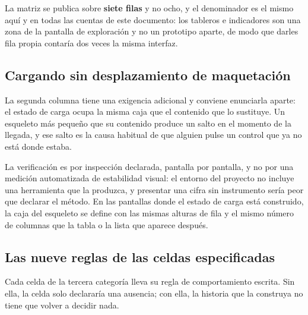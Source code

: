 La matriz se publica sobre \textbf{siete filas} y no ocho, y el denominador es el mismo aquí y en
todas las cuentas de este documento: los tableros e indicadores son una zona de la pantalla de
exploración y no un prototipo aparte, de modo que darles fila propia contaría dos veces la misma
interfaz.

\subsection{Cargando sin desplazamiento de maquetación}

La segunda columna tiene una exigencia adicional y conviene enunciarla aparte: el estado de carga
ocupa la misma caja que el contenido que lo sustituye. Un esqueleto más pequeño que su contenido
produce un salto en el momento de la llegada, y ese salto es la causa habitual de que alguien pulse
un control que ya no está donde estaba.

La verificación es por inspección declarada, pantalla por pantalla, y no por una medición
automatizada de estabilidad visual: el entorno del proyecto no incluye una herramienta que la
produzca, y presentar una cifra sin instrumento sería peor que declarar el método. En las pantallas
donde el estado de carga está construido, la caja del esqueleto se define con las mismas alturas de
fila y el mismo número de columnas que la tabla o la lista que aparece después.

\subsection{Las nueve reglas de las celdas especificadas}

Cada celda de la tercera categoría lleva su regla de comportamiento escrita. Sin ella, la celda solo
declararía una ausencia; con ella, la historia que la construya no tiene que volver a decidir nada.

